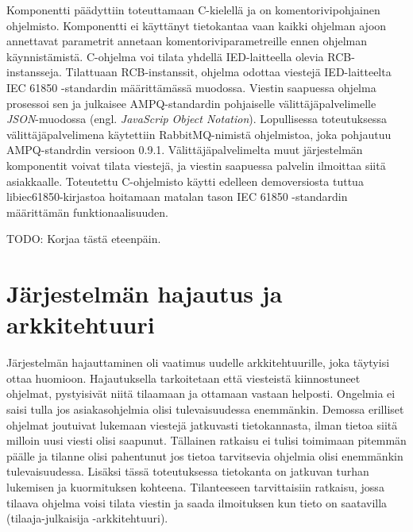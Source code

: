 Komponentti päädyttiin toteuttamaan C-kielellä ja on komentorivipohjainen ohjelmisto. Komponentti ei käyttänyt tietokantaa vaan kaikki ohjelman ajoon annettavat parametrit annetaan komentoriviparametreille ennen ohjelman käynnistämistä. C-ohjelma voi tilata yhdellä IED-laitteella olevia RCB-instansseja. Tilattuaan RCB-instanssit, ohjelma odottaa viestejä IED-laitteelta IEC 61850 -standardin määrittämässä muodossa. Viestin saapuessa ohjelma prosessoi sen ja julkaisee AMPQ-standardin pohjaiselle välittäjäpalvelimelle \emph{JSON}-muodossa (engl. \emph{JavaScrip Object Notation}). Lopullisessa toteutuksessa välittäjäpalvelimena käytettiin RabbitMQ-nimistä ohjelmistoa, joka pohjautuu AMPQ-standrdin versioon 0.9.1. Välittäjäpalvelimelta muut järjestelmän komponentit voivat tilata viestejä, ja viestin saapuessa palvelin ilmoittaa siitä asiakkaalle. Toteutettu C-ohjelmisto käytti edelleen demoversiosta tuttua libiec61850-kirjastoa hoitamaan matalan tason IEC 61850 -standardin määrittämän funktionaalisuuden.

TODO: Korjaa tästä eteenpäin.

\section{Järjestelmän hajautus ja arkkitehtuuri}
\label{ch:järjestelmän-hajautus-ja-arkkitehtuuri}
Järjestelmän hajauttaminen oli vaatimus uudelle arkkitehtuurille, joka täytyisi ottaa huomioon. Hajautuksella tarkoitetaan että viesteistä kiinnostuneet ohjelmat, pystyisivät niitä tilaamaan ja ottamaan vastaan helposti. Ongelmia ei saisi tulla jos asiakasohjelmia olisi tulevaisuudessa enemmänkin. Demossa erilliset ohjelmat joutuivat lukemaan viestejä jatkuvasti tietokannasta, ilman tietoa siitä milloin uusi viesti olisi saapunut. Tällainen ratkaisu ei tulisi toimimaan pitemmän päälle ja tilanne olisi pahentunut jos tietoa tarvitsevia ohjelmia olisi enemmänkin tulevaisuudessa. Lisäksi tässä toteutuksessa tietokanta on jatkuvan turhan lukemisen ja kuormituksen kohteena. Tilanteeseen tarvittaisiin ratkaisu, jossa tilaava ohjelma voisi tilata viestin ja saada ilmoituksen kun tieto on saatavilla (tilaaja-julkaisija -arkkitehtuuri).

